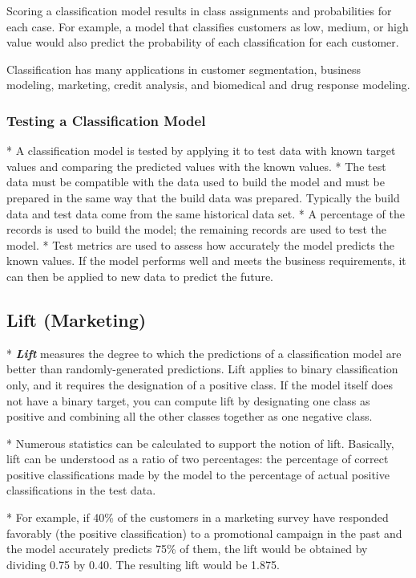Scoring a classification model results in class assignments and probabilities for each case. For example, a model that classifies customers as low, medium, or high value would also predict the probability of each classification for each customer.

Classification has many applications in customer segmentation, business modeling, marketing, credit analysis, and biomedical and drug response modeling.

\subsubsection{Testing a Classification Model}

* A classification model is tested by applying it to test data with known target values and comparing the predicted values with the known values.
* The test data must be compatible with the data used to build the model and must be prepared in the same way that the build data was prepared. Typically the build data and test data come from the same historical data set. * A percentage of the records is used to build the model; the remaining records are used to test the model.
* Test metrics are used to assess how accurately the model predicts the known values. If the model performs well and meets the business requirements, it can then be applied to new data to predict the future.



\subsection{Lift (Marketing) }

* \textbf{\textit{Lift}} measures the degree to which the predictions of a classification model are better than randomly-generated predictions. Lift applies to binary classification only, and it requires the designation of a positive class. If the model itself does not have a binary target, you can compute lift by designating one class as positive and combining all the other classes together as one negative class.

* Numerous statistics can be calculated to support the notion of lift. Basically, lift can be understood as a ratio of two percentages: the percentage of correct positive classifications made by the model to the percentage of actual positive classifications in the test data.

* For example, if 40\% of the customers in a marketing survey have responded favorably (the positive classification) to a promotional campaign in the past and the model accurately predicts 75\% of them, the lift would be obtained by dividing 0.75 by 0.40. The resulting lift would be 1.875.

